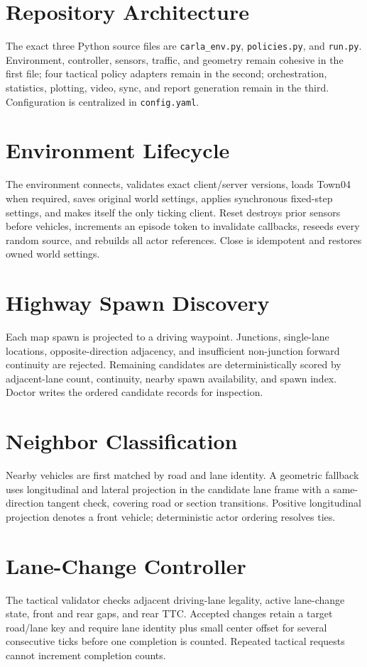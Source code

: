 \documentclass[10pt]{article}
\begin{document}
\section{Repository Architecture}
The exact three Python source files are \texttt{carla\_env.py},
\texttt{policies.py}, and \texttt{run.py}. Environment, controller, sensors,
traffic, and geometry remain cohesive in the first file; four tactical policy
adapters remain in the second; orchestration, statistics, plotting, video, sync,
and report generation remain in the third. Configuration is centralized in
\texttt{config.yaml}.

\section{Environment Lifecycle}
The environment connects, validates exact client/server versions, loads Town04
when required, saves original world settings, applies synchronous fixed-step
settings, and makes itself the only ticking client. Reset destroys prior
sensors before vehicles, increments an episode token to invalidate callbacks,
reseeds every random source, and rebuilds all actor references. Close is
idempotent and restores owned world settings.

\section{Highway Spawn Discovery}
Each map spawn is projected to a driving waypoint. Junctions, single-lane
locations, opposite-direction adjacency, and insufficient non-junction forward
continuity are rejected. Remaining candidates are deterministically scored by
adjacent-lane count, continuity, nearby spawn availability, and spawn index.
Doctor writes the ordered candidate records for inspection.

\section{Neighbor Classification}
Nearby vehicles are first matched by road and lane identity. A geometric
fallback uses longitudinal and lateral projection in the candidate lane frame
with a same-direction tangent check, covering road or section transitions.
Positive longitudinal projection denotes a front vehicle; deterministic actor
ordering resolves ties.

\section{Lane-Change Controller}
The tactical validator checks adjacent driving-lane legality, active
lane-change state, front and rear gaps, and rear TTC. Accepted changes retain a
target road/lane key and require lane identity plus small center offset for
several consecutive ticks before one completion is counted. Repeated tactical
requests cannot increment completion counts.
\end{document}
